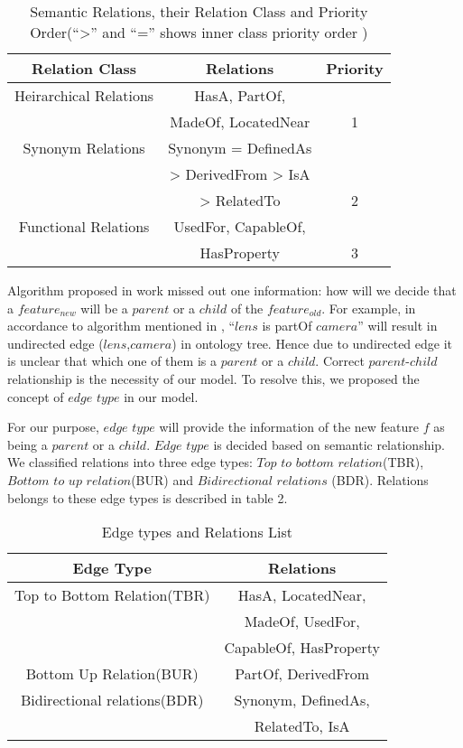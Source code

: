 \begin{table}[h!]
\begin{center}
	\begin{tabular}{ |c|c|c| } 
		\hline
		Relation Class & Relations & Priority \\
		\hline
		Heirarchical Relations & HasA, PartOf, &\\
								& MadeOf, LocatedNear & 1 \\ 
		\hline
		Synonym Relations & Synonym = DefinedAs &\\
					   	& > DerivedFrom > IsA & \\
					   	& > RelatedTo & 2\\ 
		\hline
		Functional Relations & UsedFor, CapableOf, &\\
							& HasProperty & 3 \\ 
		\hline
	\end{tabular}
	\caption {Semantic Relations, their Relation Class and Priority Order(``>'' and ``='' shows inner class priority order )}
\end{center}
\end{table}

Algorithm proposed in work\cite{mukherjee2013sentiment} missed out one information: how will we decide that a $feature_{new}$ will be a $parent$ or a $child$ of the $feature_{old}$. For example, in accordance to algorithm mentioned in \cite{mukherjee2013sentiment} , ``$lens$ is partOf $camera$'' will result in undirected edge ($lens$,$camera$) in ontology tree. Hence due to undirected edge it is unclear that which one of them is a $parent$ or a $child$. Correct $parent$-$child$ relationship is the necessity of our model. To resolve this, we proposed the concept of $edge$ $type$ in our model.

For our purpose, $edge$ $type$ will provide the information of the new feature $f$ as being a $parent$ or a $child$. $Edge$ $type$ is decided based on semantic relationship. We classified relations into three edge types: $Top$ $to$ $bottom$ $relation$(TBR), $Bottom$ $to$ $up$ $relation$(BUR) and $Bidirectional$ $relations$ (BDR). Relations belongs to these edge types is described in table 2.

\begin{table}[h!]
\begin{center}
	\begin{tabular}{ |c|c| } 
		\hline
		Edge Type & Relations \\
		\hline
		Top to Bottom Relation(TBR) & HasA, LocatedNear, \\
									& MadeOf, UsedFor, \\
									& CapableOf, HasProperty \\
		\hline
		Bottom Up Relation(BUR) & PartOf, DerivedFrom  \\
		\hline
		Bidirectional relations(BDR) & Synonym, DefinedAs, \\
									 & RelatedTo, IsA \\
		\hline
	\end{tabular}
\end{center}
\caption {Edge types and Relations List}
\end{table}

